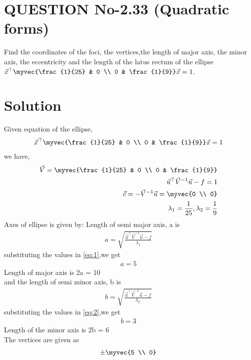 \documentclass[journal,12pt,twocolumn]{IEEEtran}
\begin{document}
\section{QUESTION No-2.33 (Quadratic forms)}
 Find the coordinates of the foci, the vertices,the length of major axis, the minor axis, the eccentricity and the length of the latus
rectum of the ellipse $\vec{x}^{\top}\myvec{\frac{1}{25} & 0 \\ 0 & \frac{1}{9}}\vec{x} = 1$.
%
\section{Solution}
Given equation of the ellipse,
\begin{align}
  \vec{x}^{\top}\myvec{\frac{1}{25} & 0 \\ 0 & \frac{1}{9}}\vec{x} = 1
\end{align}
we have,
\begin{align}
    \vec{V} = \myvec{\frac{1}{25} & 0 \\ 0 & \frac{1}{9}}
    \\
    \vec{u}^{\top}\vec{V}^{-1}\vec{u}-f = 1
    \\
    \vec{c} = -\vec{V}^{-1}\vec{u}=\myvec{0 \\ 0}
    \\
    \lambda_1 = \frac{1}{25} , \lambda_2 = \frac{1}{9}
\end{align}
Axes of ellipse is given by:
Length of semi major axis, a is
\begin{align}
  a = \sqrt{\frac{\vec{u}^{\top}\vec{V}^{-1}\vec{u}-f}{\lambda_1}} \label{eq:1}
 \end{align}
 substituting the values in \eqref{eq:1},we get
 \begin{align}
    a = 5 
 \end{align}
Length of major axis is 2a = 10
\\
 and the length of semi minor axis, b is
  \begin{align}
    b = \sqrt{\frac{\vec{u}^{\top}\vec{V}^{-1}\vec{u}-f}{\lambda_2}} \label{eq:2}
 \end{align}
 substituting the values in \eqref{eq:2},we get
 \begin{align}
    b = 3 
\end{align}
 Length of the minor axis is 2b = 6
\\
The vertices are given as
\begin{align}
    \pm\myvec{5 \\ 0} 
\end{align}
\end{document}
